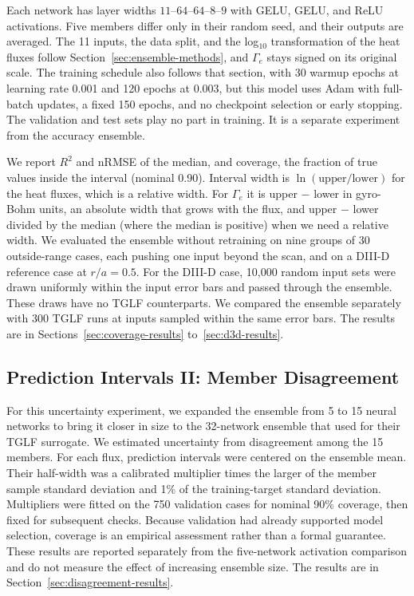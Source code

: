 \documentclass[12pt,letterpaper]{article}
\begin{document}
Each network has layer widths $11$--$64$--$64$--$8$--$9$ with GELU, GELU, and
ReLU activations. Five members differ only in their random seed, and their
outputs are averaged. The 11 inputs, the data split, and the log$_{10}$
transformation of the heat fluxes follow Section~\ref{sec:ensemble-methods},
and $\Gamma_e$ stays signed on its original scale. The training schedule also
follows that section, with 30 warmup epochs at learning rate 0.001 and 120
epochs at 0.003, but this model uses Adam with full-batch updates, a fixed 150
epochs, and no checkpoint selection or early stopping. The validation and test
sets play no part in training. It is a separate experiment from the
accuracy ensemble.

We report $R^2$ and nRMSE of the median, and coverage, the fraction of true
values inside the interval (nominal 0.90). Interval width is $\ln(\text{upper}
  / \text{lower})$ for the heat fluxes, which is a relative width. For
$\Gamma_e$ it is upper $-$ lower in gyro-Bohm units, an absolute width that
grows with the flux, and upper $-$ lower divided by the median (where the
median is positive) when we need a relative width. We evaluated the ensemble
without retraining on nine groups of 30 outside-range cases, each pushing one
input beyond the scan, and on a DIII-D reference case at $r/a = 0.5$. For the
DIII-D case, 10,000 random input sets were drawn uniformly within the input
error bars and passed through the ensemble. These draws have no TGLF
counterparts. We compared the ensemble separately with 300 TGLF runs at inputs
sampled within the same error bars. The results are in
Sections~\ref{sec:coverage-results} to~\ref{sec:d3d-results}.

\subsection{Prediction Intervals II: Member Disagreement}
\label{sec:disagreement-methods}

For this uncertainty experiment, we expanded the ensemble from 5 to 15 neural
networks to bring it closer in size to the 32-network ensemble that
\citet[Section~3.1]{meneghini2017} used for their TGLF surrogate. We estimated
uncertainty from disagreement among the 15 members.
For each flux, prediction intervals were centered on the ensemble mean. Their
half-width was a calibrated multiplier times the larger of the member sample
standard deviation and 1\% of the training-target standard deviation.
Multipliers were fitted on the 750 validation cases for nominal 90\% coverage,
then fixed for subsequent checks. Because validation had already supported
model selection, coverage is an empirical assessment rather than a formal
guarantee. These results are reported separately from the five-network
activation comparison and do not measure the effect of increasing ensemble size.
The results are in Section~\ref{sec:disagreement-results}.
\end{document}
